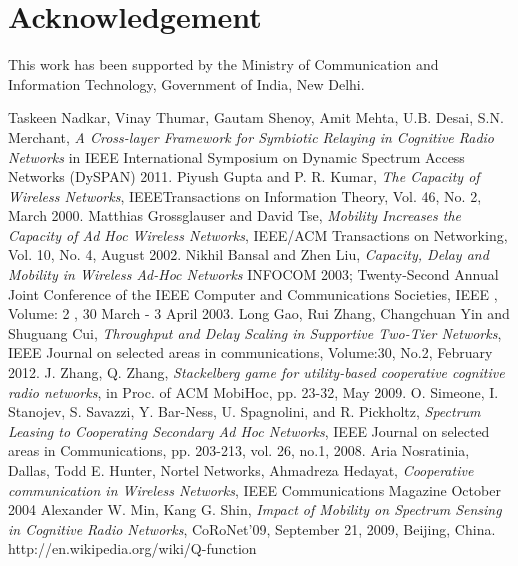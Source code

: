 \documentclass[conference]{IEEEtran}
\begin{document}
\section{Acknowledgement}
This work has been supported by the Ministry of Communication and Information Technology, Government of India, New Delhi.
\begin{thebibliography}{1}
Taskeen Nadkar, Vinay Thumar, Gautam Shenoy, Amit Mehta, U.B. Desai, S.N. Merchant, \emph{A Cross-layer Framework for Symbiotic Relaying in 
Cognitive Radio Networks} in IEEE International Symposium on Dynamic Spectrum Access Networks (DySPAN) 2011.
Piyush Gupta and P. R. Kumar, \emph{The Capacity of Wireless Networks}, IEEETransactions on Information Theory, Vol. 46, No. 2, March 2000.
Matthias Grossglauser and David Tse, \emph{Mobility Increases the Capacity of Ad Hoc Wireless Networks}, IEEE/ACM Transactions on Networking, 
Vol. 10, No. 4, August 2002.
Nikhil Bansal and Zhen Liu, \emph{Capacity, Delay and Mobility in Wireless Ad-Hoc
Networks} INFOCOM 2003; Twenty-Second Annual Joint Conference of the IEEE
Computer and Communications Societies, IEEE , Volume: 2 , 30 March - 3 April 2003.
Long Gao, Rui Zhang, Changchuan Yin and Shuguang Cui, \emph{Throughput and Delay Scaling in Supportive Two-Tier Networks}, IEEE Journal on 
selected areas in communications, Volume:30, No.2, February 2012.
J. Zhang, Q. Zhang, \emph{Stackelberg game for utility-based cooperative cognitive radio networks}, in Proc. of ACM MobiHoc, pp. 23-32, May 2009.
O. Simeone, I. Stanojev, S. Savazzi, Y. Bar-Ness, U. Spagnolini, and R. Pickholtz, \emph{Spectrum Leasing to Cooperating Secondary Ad Hoc Networks}, 
IEEE Journal on selected areas in Communications, pp. 203-213, vol. 26, no.1, 2008.
Aria Nosratinia, Dallas, Todd E. Hunter, Nortel Networks, Ahmadreza Hedayat, \emph{Cooperative communication in Wireless Networks}, 
IEEE Communications Magazine October 2004
Alexander W. Min, Kang G. Shin, \emph{Impact of Mobility on Spectrum Sensing in Cognitive Radio Networks}, CoRoNet'09, September 21, 2009, Beijing, China. 
http://en.wikipedia.org/wiki/Q-function
\end{thebibliography}
\end{document}
